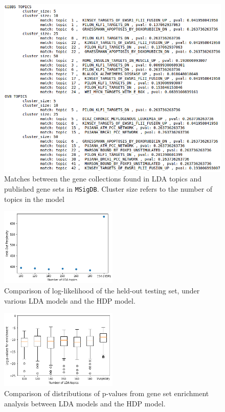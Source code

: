 \documentclass{article}
\begin{document}
\begin{figure}
    \centering
    \includegraphics[width=1\textwidth]{figs/pathways}
    \caption{Matches between the gene collections found in LDA topics and published gene sets in \texttt{MSigDB}. Cluster size refers to the number of topics in the model}
    \label{fig:pathways}
\end{figure}

\begin{figure}
    \centering
    \includegraphics[width=0.5\textwidth]{figs/hdp-perplexity}
    \caption{Comparison of log-likelihood of the held-out testing set, under various LDA models and the HDP model.}
    \label{fig:hdp-perplexity}
\end{figure}

\begin{figure}
    \centering
    \includegraphics[width=0.5\textwidth]{figs/hdp-enrichment}
    \caption{Comparison of distributions of p-values from gene set enrichment analysis between LDA models and the HDP model.}
    \label{fig:hdp-enrichment}
\end{figure}
\end{document}

